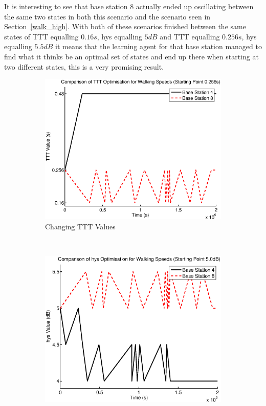 It is interesting to see that base station 8 actually ended up oscillating between the same two states in both this scenario and the scenario seen in Section~\ref{walk_high}. With both of these scenarios finished between the same states of TTT equalling $0.16 s$, hys equalling $5 dB$ and TTT equalling $0.256 s$, hys equalling $5.5 dB$ it means that the learning agent for that base station managed to find what it thinks be an optimal set of states and end up there when starting at two different states, this is a very promising result. 
\begin{figure}[H]
        \centering
        \begin{subfigure}[b]{0.49\textwidth}
                \includegraphics[width=\textwidth]{figures/walking_figures/mid/long_ttt.eps}
                \caption{Changing TTT Values}
                \label{fig:walk_mid_ttt}
        \end{subfigure}%
        ~ %
        \begin{subfigure}[b]{0.49\textwidth}
                \includegraphics[width=\textwidth]{figures/walking_figures/mid/long_hys.eps}

\end{subfigure}
\end{figure}
